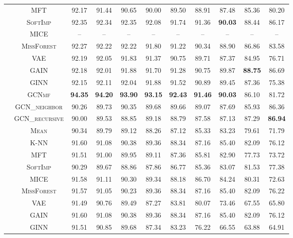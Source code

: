 \begin{table}[!p]
{\begin{tabular}{c|c|ccccccccc}
& \textsc{MFT} & 92.17 & 91.44 & 90.65 & 90.00 & 89.50 & 88.91 & 87.48 & 85.36 & 80.20\\
& \textsc{SoftImp} & {92.35} & {92.34} & {92.35} & {92.08} & {91.74} & {91.36} & \textbf{90.03} & {88.44} & {86.17}\\
& \textsc{MICE} & -- & -- & -- & -- & -- & -- & -- & -- & --\\
& \textsc{MissForest} & 92.27 & 92.22 & 92.22 & 91.80 & 91.22 & 90.34 & 88.90 & 86.86 & 83.58\\
& \textsc{VAE} & 92.19 & 92.05 & 91.83 & 91.37 & 90.75 & 89.71 & 87.37 & 84.95 & 76.71\\
& \textsc{GAIN} & 92.18 & 92.01 & 91.88 & 91.70 & 91.28 & 90.75 & {89.87} & \textbf{88.75} & 86.69\\
& \textsc{GINN} & 92.15 & 92.11 & 92.04 & 91.88 & 91.52 & 90.89 & 89.45 & 87.36 & 75.38\\
& \textsc{GCNmf} & \textbf{94.35} & \textbf{94.20} & \textbf{93.90} & \textbf{93.15} & \textbf{92.43} & \textbf{91.46} & \textbf{90.03} & 86.10 & 81.72\\ 
& \textsc{GCN\_neighbor}  & 90.26 & 89.73 & 90.35 & 89.68 & 89.66 & 89.07 & 87.69 & 85.93 & 86.36 \\
& \textsc{GCN\_recursive} & 90.00 & 89.53 & 88.85 & 89.18 & 88.79 & 87.58 & 87.13 & 87.29 & \textbf{86.94} \\
\midrule
{} & \textsc{Mean} & 90.34 & 89.79 & 89.12 & 88.26 & 87.12 & 85.33 & 83.23 & 79.61 & 71.79\\
& \textsc{K-NN} & {91.60} & 91.08 & {90.38} & {89.36} & {88.34} & 87.16 & 85.40 & 82.09 & 76.12\\
& \textsc{MFT} & 91.51 & 91.00 & 89.95 & 89.11 & 87.36 & 85.81 & 82.90 & 77.73 & 73.72\\
& \textsc{SoftImp} & 90.29 & 89.67 & 88.86 & 87.86 & 86.77 & 85.36 & 83.07 & {81.53} & 77.38\\
& \textsc{MICE} & 91.58 & {91.11} & 90.30 & 89.34 & 88.18 & {86.70} & {84.24} & 80.31 & 72.63\\
& \textsc{MissForest} & 91.57 & 91.05 & 90.23 & {89.36} & {88.34} & 87.16 & 85.40 & 82.09 & {76.22}\\
& \textsc{VAE} & 91.49 & 90.76 & 89.49 & 87.27 & 83.81 & 80.07 & 73.46 & 67.55 & 65.80\\
& \textsc{GAIN} & {91.60} & 91.08 & {90.38} & {89.36} & {88.34} & 87.16 & 85.40 & 82.09 & 76.12\\
& \textsc{GINN} & 91.51 & 90.85 & 89.68 & 87.34 & 83.23 & 76.22 & 66.55 & 63.88 & 64.91\\

\end{tabular}}
\end{table}
